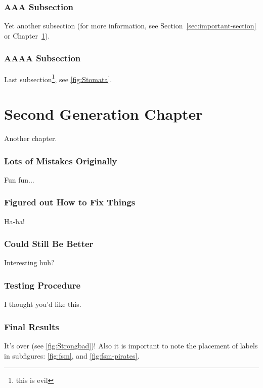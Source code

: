 \subsection{AAA Subsection}
Yet another subsection (for more information, see Section~\ref{sec:important-section} or Chapter~\ref{cha:important-chapter}).

\subsection{AAAA Subsection}
Last subsection\footnote{this is evil}, see \ref{fig:Stomata}.








\chapter{Second Generation Chapter}
\label{cha:important-chapter}
Another chapter.

\subsection{Lots of Mistakes Originally}
Fun fun...

\subsection{Figured out How to Fix Things}
Ha-ha!

\subsection{Could Still Be Better}
Interesting huh?

\subsection{Testing Procedure}
I thought you'd like this.

\subsection{Final Results}
It's over (see \ref{fig:Strongbad})!  Also it is important to note the placement of labels in subfigures: \ref{fig:fsm}, and \ref{fig:fsm-pirates}.

